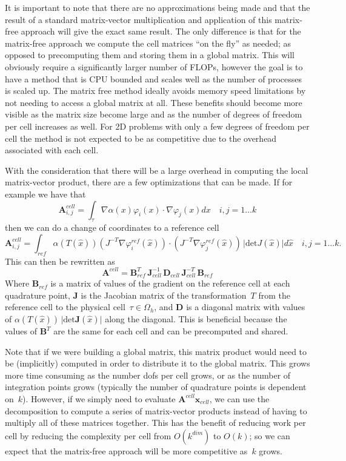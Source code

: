 \documentclass[12pt]{article}
\newcommand{\vect}[1]{\boldsymbol{\mathbf{#1}}}
\newcommand{\dofspercell}{k}
\begin{document}
It is important to note that there are no approximations being made and that the result of a standard matrix-vector multiplication and application of this matrix-free approach will give the exact same result. The only difference is that for the matrix-free approach we compute the cell matrices ``on the fly'' as needed; as opposed to precomputing them and storing them in a global matrix. This will obviously require a significantly larger number of FLOPs, however the goal is to have a method that is CPU bounded and scales well as the number of processes is scaled up. The matrix free method ideally avoids memory speed limitations by not needing to access a global matrix at all. These benefits should become more visible as the matrix size become large and as the number of degrees of freedom per cell increases as well. For 2D problems with only a few degrees of freedom per cell the method is not expected to be as competitive due to the overhead associated with each cell. 

With the consideration that there will be a large overhead in computing the local matrix-vector product, there are a few optimizations that can be made. If for example we have that 
$$\mathbf{A}^{cell}_{i,j} = \int_{\tau}\nabla \alpha(x) \varphi_{i}(x) \cdot \nabla \varphi_{j}(x) dx\quad i,j = 1 \ldots \dofspercell$$ 
then we can do a change of coordinates to a reference cell
$$
	\mathbf{A}^{cell}_{i,j} = \int_{ref} \alpha(T(\hat{x})) (J^{-T}\nabla \varphi_{i}^{ref}(\hat{x})) \cdot (J^{-T}\nabla \varphi_{j}^{ref}(\hat{x}))\,\vert \mathrm{det}J(\hat x) \vert d\hat{x} \quad i,j = 1 \ldots \dofspercell.
$$ 
This can then be rewritten as 
\begin{equation}\label{decomp}
	\mathbf{A}^{cell} = \vect B^{T}_{ref}\,\vect J^{-1}_{cell}\,\vect D_{cell}\,\vect J^{-T}_{cell}\,\vect B_{ref}
\end{equation}
Where $\vect B_{ref}$ is a matrix of values of the gradient on the reference cell at each quadrature point, $\vect J$ is the Jacobian matrix of the transformation~$T$ from the reference cell to the physical cell~$\tau\in\Omega_h$, and $\vect D$ is a diagonal matrix with values of $\alpha(T(\hat{x}))\, \vert \mathrm{det}\vect J(\hat{x}) \vert$ along the diagonal. This is beneficial because the  values of $\vect B^{T}$ are the same for each cell and can be precomputed and shared.

Note that if we were building a global matrix, this matrix product would need to be (implicitly) computed in order to distribute it to the global matrix. This grows more time consuming as the number dofs per cell grows, or as the number of integration points grows (typically the number of quadrature points is dependent on~$\dofspercell$). However, if we simply need to evaluate $\vect A^{cell}\vect x_{cell}$, we can use the decomposition to compute a series of matrix-vector products instead of having to multiply all of these matrices together. This has the benefit of reducing work per cell by reducing the complexity per cell from $O(\dofspercell^{dim})$ to $O(\dofspercell)$; so we can expect that the matrix-free approach will be more competitive as~$\dofspercell$ grows.
\end{document}
